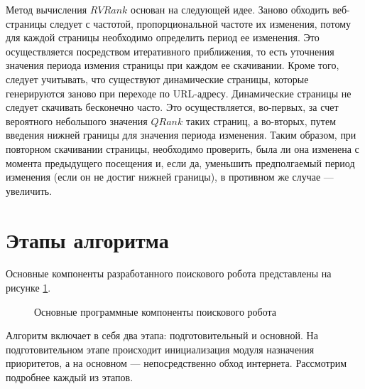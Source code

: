 Метод вычисления $RVRank$ основан на следующей идее. Заново обходить веб-страницы следует с частотой, пропорциональной частоте их изменения, потому для каждой страницы необходимо определить период ее изменения. Это осуществляется посредством итеративного приближения, то есть уточнения значения периода измения страницы при каждом ее скачивании. Кроме того, следует учитывать, что существуют динамические страницы, которые генерируются заново при переходе по URL-адресу. Динамические страницы не следует скачивать бесконечно часто. Это осуществляется, во-первых, за счет вероятного небольшого значения $QRank$ таких страниц, а во-вторых, путем введения нижней границы для значения периода изменения. Таким образом, при повторном скачивании страницы, необходимо проверить, была ли она изменена с момента предыдущего посещения и, если да, уменьшить предполгаемый период изменения (если он не достиг нижней границы), в противном же случае --- увеличить.

\section{Этапы алгоритма}
\label{steps}

Основные компоненты разработанного поискового робота представлены на рисунке \ref{architecture}.

\begin{figure}[h!]
\caption{Основные программные компоненты поискового робота}
\label{architecture}
\end{figure}

Алгоритм включает в себя два этапа: подготовительный  и основной. На подготовительном этапе происходит инициализация модуля назначения приоритетов, а на основном --- непосредственно обход интернета. Рассмотрим подробнее каждый из этапов.

